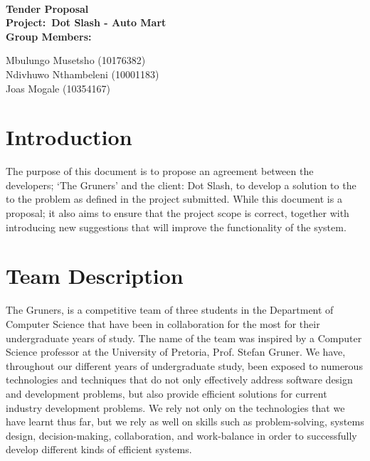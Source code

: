 \documentclass[12pt]{article}
\newcommand{\Title}{\ } %
\begin{document}
        \vspace{4em}
        
        \begin{center}%
        
          \LARGE \bf \Title \\[10em]
          \LARGE {\bf Tender Proposal}\\[1em]
          \LARGE {\bf Project:\ Dot Slash - Auto Mart}\\[1em]
          \LARGE {\bf Group Members:}\\[2em]
          \large
          
             Mbulungo Musetsho                          (10176382) \\[1em]
             Ndivhuwo Nthambeleni (10001183)	\\[1em]
             Joas Mogale (10354167)		\\[1em]
            
        \end{center}%
        

        \newpage
        \tableofcontents    
                \newpage
                \section{Introduction}
               	The purpose of this document is to propose an agreement between the developers; ‘The Gruners’ and the client: Dot Slash, to develop a solution to the to the problem as defined in the project submitted. While this document is a proposal; it also aims to ensure that the project scope is correct, together with introducing new suggestions that will improve the functionality of the system. 
                \section{Team Description}
                The Gruners, is a competitive team of three students in the Department of Computer Science that have been in collaboration for the most for their undergraduate years of study. The name of the team was inspired by a Computer Science professor at the University of Pretoria, Prof. Stefan Gruner. We have, throughout our different years of undergraduate study, been exposed to numerous technologies and techniques that do not only effectively address software design and development problems, but also provide efficient solutions for current industry development problems. We rely not only on the technologies that we have learnt thus far, but we rely as well on skills such as problem-solving, systems design, decision-making, collaboration, and work-balance in order to successfully develop different kinds of efficient systems.
\end{document}
